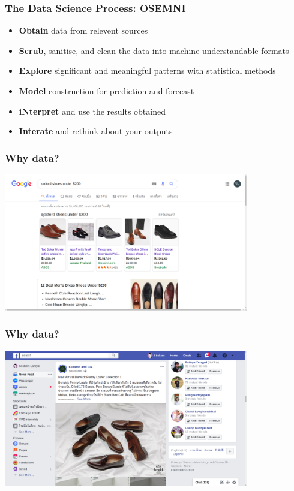 \documentclass[aspectratio=169]{beamer}
\begin{document}
\begin{frame}
    \frametitle{The Data Science Process: OSEMNI}
    \begin{itemize}[<+(1)->]
        \item \textbf{Obtain} data from relevent sources
        \item \textbf{Scrub}, sanitise, and clean the data into machine-understandable formats
        \item \textbf{Explore} significant and meaningful patterns with statistical methods
        \item \textbf{Model} construction for prediction and forecast
        \item \textbf{iNterpret} and use the results obtained
        \item \textbf{Interate} and rethink about your outputs
    \end{itemize}
\end{frame}

\begin{frame}
    \frametitle{Why data?}
    \centering
    \includegraphics[width=0.8\textwidth]{images/leather-shoes-google.png}
\end{frame}

\begin{frame}
    \frametitle{Why data?}
    \centering
    \includegraphics[width=0.8\textwidth]{images/facebook-ads.png}
\end{frame}
\end{document}
